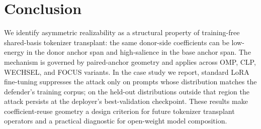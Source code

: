 \vspace{-1mm}
\section{Conclusion}
\label{sec:conclusion}
\vspace{-1mm}
We identify asymmetric realizability as a structural property of training-free shared-basis tokenizer transplant: the same donor-side coefficients can be low-energy in the donor anchor span and high-salience in the base anchor span. The mechanism is governed by paired-anchor geometry and applies across OMP, CLP, WECHSEL, and FOCUS variants. In the case study we report, standard LoRA fine-tuning suppresses the attack only on prompts whose distribution matches the defender's training corpus; on the held-out distributions outside that region the attack persists at the deployer's best-validation checkpoint. These results make coefficient-reuse geometry a design criterion for future tokenizer transplant operators and a practical diagnostic for open-weight model composition.
